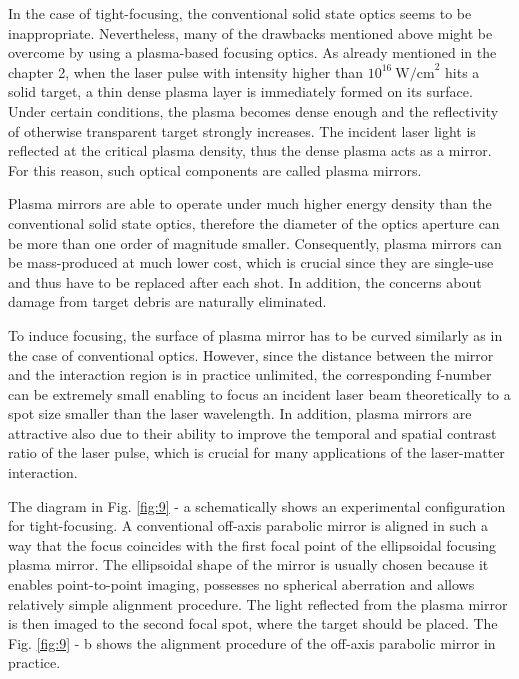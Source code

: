 In the case of tight-focusing, the conventional solid state optics seems to be inappropriate. Nevertheless, many of the drawbacks mentioned above might be overcome by using a plasma-based focusing optics. As already mentioned in the chapter 2, when the laser pulse with intensity higher than $ 10^{16} \ \mathrm{W/cm}^{2} $ hits a solid target, a thin dense plasma layer is immediately formed on its surface. Under certain conditions, the plasma becomes dense enough and the reflectivity of otherwise transparent target strongly increases. The incident laser light is reflected at the critical plasma density, thus the dense plasma acts as a mirror. For this reason, such optical components are called plasma mirrors.

Plasma mirrors are able to operate under much higher energy density than the conventional solid state optics, therefore the diameter of the optics aperture can be more than one order of magnitude smaller. Consequently, plasma mirrors can be mass-produced at much lower cost, which is crucial since they are single-use and thus have to be replaced after each shot. In addition, the concerns about damage from target debris are naturally eliminated.

To induce focusing, the surface of plasma mirror has to be curved similarly as in the case of conventional optics. However, since the distance between the mirror and the interaction region is in practice unlimited, the corresponding f-number can be extremely small enabling to focus an incident laser beam theoretically to a spot size smaller than the laser wavelength. In addition, plasma mirrors are attractive also due to their ability to improve the temporal and spatial contrast ratio of the laser pulse, which is crucial for many applications of the laser-matter interaction.

The diagram in Fig. \ref{fig:9} - a schematically shows an experimental configuration for tight-focusing. A conventional off-axis parabolic mirror is aligned in such a way that the focus coincides with the first focal point of the ellipsoidal focusing plasma mirror. The ellipsoidal shape of the mirror is usually chosen because it enables point-to-point imaging, possesses no spherical aberration and allows relatively simple alignment procedure. The light reflected from the plasma mirror is then imaged to the second focal spot, where the target should be placed. The Fig. \ref{fig:9} - b shows the alignment procedure of the off-axis parabolic mirror in practice.